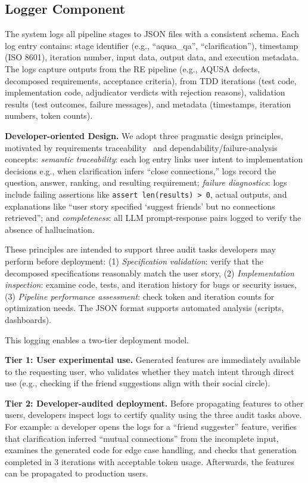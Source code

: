 \documentclass[sigconf,screen]{acmart}
\begin{document}
\subsection{Logger Component}

The system logs all pipeline stages to JSON files with a consistent schema. Each log entry contains: stage identifier (e.g., ``aqusa\_qa'', ``clarification''), timestamp (ISO 8601), iteration number, input data, output data, and execution metadata. The logs capture outputs from the RE pipeline (e.g., AQUSA defects, decomposed requirements, acceptance criteria), from TDD iterations (test code, implementation code, adjudicator verdicts with rejection reasons), validation results (test outcomes, failure messages), and metadata (timestamps, iteration numbers, token counts).

\textbf{Developer-oriented Design.}  We adopt three pragmatic design principles, motivated by requirements traceability~\cite{gotel1994traceability,vogelsang2025impact} and dependability/failure-analysis~\cite{Avizienis2004} concepts: \textit{semantic traceability}: each log entry links user intent to implementation decisions e.g., when clarification infers ``close connections,'' logs record the question, answer, ranking, and resulting requirement;  \textit{failure diagnostics}: logs include failing assertions like \texttt{assert len(results) > 0}, actual outputs, and explanations like ``user story specified `suggest friends' but no connections retrieved''; and \textit{completeness}: all LLM prompt-response pairs logged to verify the absence of hallucination.

 These principles are intended to support three audit tasks developers may perform before deployment: (1) \textit{Specification validation}: verify that the decomposed specifications reasonably match the user story, (2) \textit{Implementation inspection}: examine code, tests, and iteration history for bugs or security issues, (3) \textit{Pipeline performance assessment}: check token and iteration counts for optimization needs. The JSON format supports automated analysis (scripts, dashboards).

This logging enables a two-tier deployment model.

\textbf{Tier 1: User experimental use.} Generated features are immediately available to the requesting user, who validates whether they match intent through direct use (e.g., checking if the friend  suggestions align with their social circle).

\textbf{Tier 2: Developer-audited deployment.} Before propagating features to other users, developers inspect logs to certify quality using the three audit tasks above. For example: a developer opens the logs for a ``friend suggester'' feature, verifies that clarification inferred ``mutual connections'' from the incomplete input, examines the generated code for edge case handling, and checks that generation completed in 3 iterations with acceptable token usage. Afterwards, the features can be propagated to production users.
\end{document}
